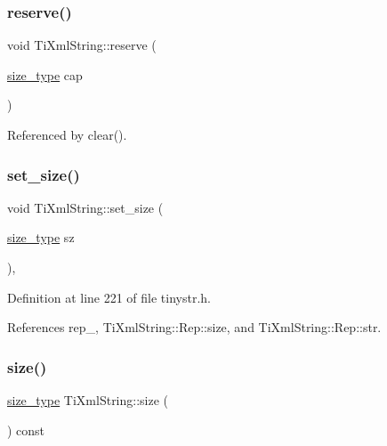 \subsubsection{\texorpdfstring{reserve()}{reserve()}}
{\footnotesize\ttfamily void Ti\+Xml\+String\+::reserve (\begin{DoxyParamCaption}\item[{\hyperlink{class_ti_xml_string_abeb2c1893a04c17904f7c06546d0b971}{size\+\_\+type}}]{cap }\end{DoxyParamCaption})}



Referenced by clear().

\hypertarget{class_ti_xml_string_a5d70615367bf2920c25feddf6ac4ad30}{}\label{class_ti_xml_string_a5d70615367bf2920c25feddf6ac4ad30} 
\subsubsection{\texorpdfstring{set\+\_\+size()}{set\_size()}}
{\footnotesize\ttfamily void Ti\+Xml\+String\+::set\+\_\+size (\begin{DoxyParamCaption}\item[{\hyperlink{class_ti_xml_string_abeb2c1893a04c17904f7c06546d0b971}{size\+\_\+type}}]{sz }\end{DoxyParamCaption})\hspace{0.3cm}{\ttfamily [inline]}, {\ttfamily [private]}}



Definition at line 221 of file tinystr.\+h.



References rep\+\_\+, Ti\+Xml\+String\+::\+Rep\+::size, and Ti\+Xml\+String\+::\+Rep\+::str.

\hypertarget{class_ti_xml_string_a483d85103d2a3ba8c0831e205c832f33}{}\label{class_ti_xml_string_a483d85103d2a3ba8c0831e205c832f33} 
\subsubsection{\texorpdfstring{size()}{size()}}
{\footnotesize\ttfamily \hyperlink{class_ti_xml_string_abeb2c1893a04c17904f7c06546d0b971}{size\+\_\+type} Ti\+Xml\+String\+::size (\begin{DoxyParamCaption}{ }\end{DoxyParamCaption}) const\hspace{0.3cm}{\ttfamily [inline]}}



